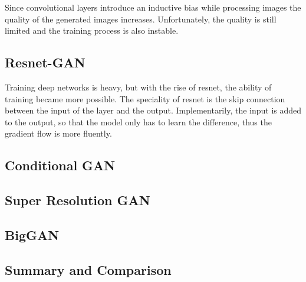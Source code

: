 Since convolutional layers introduce an inductive bias while processing images the quality of the generated images increases. Unfortunately, the quality is still limited and the training process is also instable. 

\subsection{Resnet-GAN}
\label{sec:resnet_gan}
Training deep networks is heavy, but with the rise of resnet, the ability of training became more possible. The speciality of resnet is the skip connection between the input of the layer and the output. Implementarily, the input is added to the output, so that the model only has to learn the difference, thus the gradient flow is more fluently. 

\subsection{Conditional GAN}
\label{sec:conditional_gan}

\subsection{Super Resolution GAN}
\label{sec:super_resolution_gan}

\subsection{BigGAN}
\label{sec:biggan}

\subsection{Summary and Comparison}
\label{sec:architectures_summary}